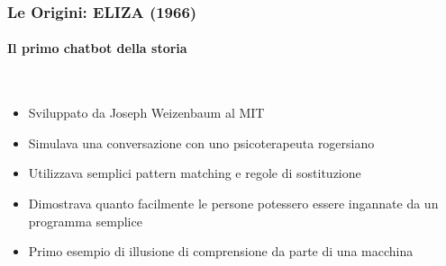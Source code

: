 %
\begin{frame}[t,fragile] \frametitle{Le Origini: ELIZA (1966)}
	{\scriptsize
		\onslide<1->
            \framesubtitle{Il primo chatbot della storia}
            \vspace*{-15pt}
            \begin{minipage}[t]{\textwidth}
            \end{minipage}
            \\\vspace*{3pt}
	    	\begin{minipage}[t]{\textwidth}
				\begin{minipage}[t]{0.6\textwidth}
	    			\begin{itemize}[leftmargin=10pt,align=right]
						\onslide<2->\item[\alert{\faHandORight}] Sviluppato da \alert{Joseph Weizenbaum} al MIT
						\onslide<3->\item[\alert{\faHandORight}] Simulava una conversazione con uno \alert{psicoterapeuta} rogersiano
						\onslide<4->\item[\alert{\faHandORight}] Utilizzava semplici \alert{pattern matching} e regole di sostituzione
						\onslide<5->\item[\alert{\faHandORight}] Dimostrava quanto facilmente le persone potessero essere \alert{ingannate} da un programma semplice
						\onslide<6->\item[\alert{\faHandORight}] Primo esempio di \alert{illusione di comprensione} da parte di una macchina
					\end{itemize}
            	\end{minipage}
            	\begin{minipage}[t]{0.4\textwidth}
            	\end{minipage}
	    	\end{minipage}
	}
\end{frame}
